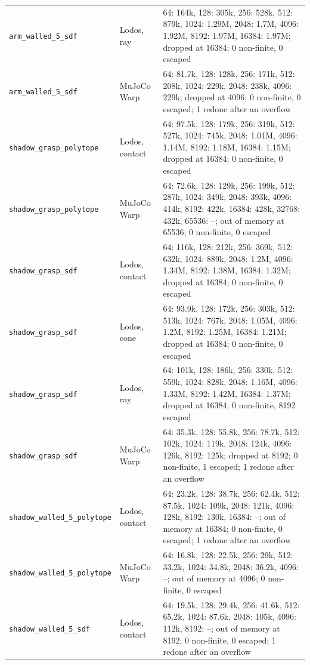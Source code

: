 \begin{longtable}{@{}llp{9.5cm}@{}}
\texttt{arm\_walled\_5\_sdf} & Lodos, ray & 64: 164k, 128: 305k, 256: 528k, 512: 879k, 1024: 1.29M, 2048: 1.7M, 4096: 1.92M, 8192: 1.97M, 16384: 1.97M; dropped at 16384; 0 non-finite, 0 escaped \\
\texttt{arm\_walled\_5\_sdf} & MuJoCo Warp & 64: 81.7k, 128: 128k, 256: 171k, 512: 208k, 1024: 229k, 2048: 238k, 4096: 229k; dropped at 4096; 0 non-finite, 0 escaped; 1 redone after an overflow \\
\texttt{shadow\_grasp\_polytope} & Lodos, contact & 64: 97.5k, 128: 179k, 256: 319k, 512: 527k, 1024: 745k, 2048: 1.01M, 4096: 1.14M, 8192: 1.18M, 16384: 1.15M; dropped at 16384; 0 non-finite, 0 escaped \\
\texttt{shadow\_grasp\_polytope} & MuJoCo Warp & 64: 72.6k, 128: 129k, 256: 199k, 512: 287k, 1024: 349k, 2048: 393k, 4096: 414k, 8192: 422k, 16384: 428k, 32768: 432k, 65536: --; out of memory at 65536; 0 non-finite, 0 escaped \\
\texttt{shadow\_grasp\_sdf} & Lodos, contact & 64: 116k, 128: 212k, 256: 369k, 512: 632k, 1024: 889k, 2048: 1.2M, 4096: 1.34M, 8192: 1.38M, 16384: 1.32M; dropped at 16384; 0 non-finite, 0 escaped \\
\texttt{shadow\_grasp\_sdf} & Lodos, cone & 64: 93.9k, 128: 172k, 256: 303k, 512: 513k, 1024: 767k, 2048: 1.05M, 4096: 1.2M, 8192: 1.25M, 16384: 1.21M; dropped at 16384; 0 non-finite, 0 escaped \\
\texttt{shadow\_grasp\_sdf} & Lodos, ray & 64: 101k, 128: 186k, 256: 330k, 512: 559k, 1024: 828k, 2048: 1.16M, 4096: 1.33M, 8192: 1.42M, 16384: 1.37M; dropped at 16384; 0 non-finite, 8192 escaped \\
\texttt{shadow\_grasp\_sdf} & MuJoCo Warp & 64: 35.3k, 128: 55.8k, 256: 78.7k, 512: 102k, 1024: 119k, 2048: 124k, 4096: 126k, 8192: 125k; dropped at 8192; 0 non-finite, 1 escaped; 1 redone after an overflow \\
\texttt{shadow\_walled\_5\_polytope} & Lodos, contact & 64: 23.2k, 128: 38.7k, 256: 62.4k, 512: 87.5k, 1024: 109k, 2048: 121k, 4096: 128k, 8192: 130k, 16384: --; out of memory at 16384; 0 non-finite, 0 escaped; 1 redone after an overflow \\
\texttt{shadow\_walled\_5\_polytope} & MuJoCo Warp & 64: 16.8k, 128: 22.5k, 256: 29k, 512: 33.2k, 1024: 34.8k, 2048: 36.2k, 4096: --; out of memory at 4096; 0 non-finite, 0 escaped \\
\texttt{shadow\_walled\_5\_sdf} & Lodos, contact & 64: 19.5k, 128: 29.4k, 256: 41.6k, 512: 65.2k, 1024: 87.6k, 2048: 105k, 4096: 112k, 8192: --; out of memory at 8192; 0 non-finite, 0 escaped; 1 redone after an overflow \\

\end{longtable}
